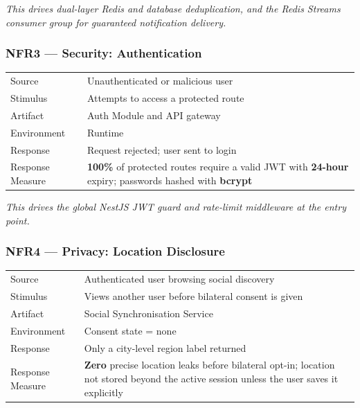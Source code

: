 \documentclass[12pt,a4paper]{article}
\begin{document}
\textit{This drives dual-layer Redis and database deduplication, and the Redis Streams consumer
group for guaranteed notification delivery.}

\vspace{1em}
\subsubsection{NFR3 --- Security: Authentication}

\begin{tabularx}{\textwidth}{@{}L{3.5cm}X@{}}
\toprule
Source & Unauthenticated or malicious user \\
Stimulus & Attempts to access a protected route \\
Artifact & Auth Module and API gateway \\
Environment & Runtime \\
Response & Request rejected; user sent to login \\
Response Measure & \textbf{100\%} of protected routes require a valid JWT with
  \textbf{24-hour} expiry; passwords hashed with \textbf{bcrypt} \\
\bottomrule
\end{tabularx}

\textit{This drives the global NestJS JWT guard and rate-limit middleware at the entry point.}

\vspace{1em}
\subsubsection{NFR4 --- Privacy: Location Disclosure}

\begin{tabularx}{\textwidth}{@{}L{3.5cm}X@{}}
\toprule
Source & Authenticated user browsing social discovery \\
Stimulus & Views another user before bilateral consent is given \\
Artifact & Social Synchronisation Service \\
Environment & Consent state = none \\
Response & Only a city-level region label returned \\
Response Measure & \textbf{Zero} precise location leaks before bilateral opt-in; location not
  stored beyond the active session unless the user saves it explicitly \\
\bottomrule
\end{tabularx}
\end{document}
